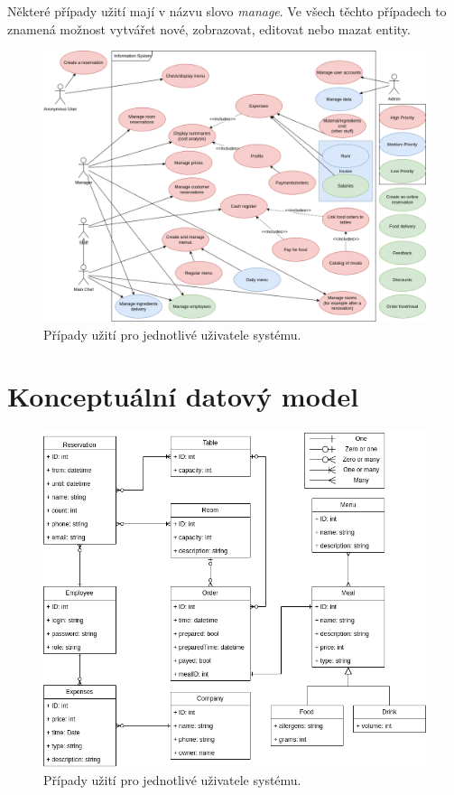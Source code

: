 \documentclass[a4paper]{article}
\begin{document}
Některé případy užití mají v názvu slovo \emph{manage}. Ve všech těchto případech to
znamená možnost vytvářet nové, zobrazovat, editovat nebo mazat entity.

\begin{figure}[ht]
    \centering
    \includegraphics[width=\textwidth]{use_case.png}
    \caption{Případy užití pro jednotlivé uživatele systému.}
\end{figure}

\newpage
\section{Konceptuální datový model}
\begin{figure}[ht]
    \centering
    \includegraphics[width=\textwidth]{uml.png}
    \caption{Případy užití pro jednotlivé uživatele systému.}
\end{figure}
\end{document}
